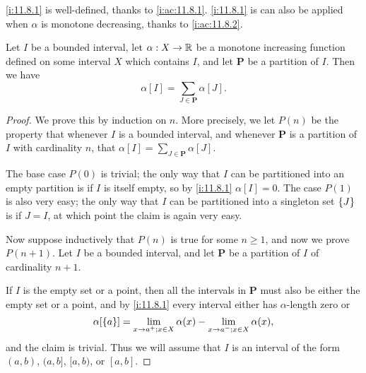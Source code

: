 \begin{note}
  \cref{i:11.8.1} is well-defined, thanks to \cref{i:ac:11.8.1}.
  \cref{i:11.8.1} is can also be applied when \(\alpha\) is monotone decreasing, thanks to \cref{i:ac:11.8.2}.
\end{note}

\setcounter{thm}{3}
\begin{lem}\label{i:11.8.4}
  Let \(I\) be a bounded interval, let \(\alpha : X \to \mathbb{R}\) be a monotone increasing function defined on some interval \(X\) which contains \(I\), and let \(\mathbf{P}\) be a partition of \(I\).
  Then we have
  \[
    \alpha[I] = \sum_{J \in \mathbf{P}} \alpha[J].
  \]
\end{lem}

\begin{proof}
  We prove this by induction on \(n\).
  More precisely, we let \(P(n)\) be the property that whenever \(I\) is a bounded interval, and whenever \(\mathbf{P}\) is a partition of \(I\) with cardinality \(n\), that \(\alpha[I] = \sum_{J \in \mathbf{P}} \alpha[J]\).

  The base case \(P(0)\) is trivial;
  the only way that \(I\) can be partitioned into an empty partition is if \(I\) is itself empty, so by \cref{i:11.8.1} \(\alpha[I] = 0\).
  The case \(P(1)\) is also very easy;
  the only way that \(I\) can be partitioned into a singleton set \(\left\lbrace J\right\rbrace\) is if \(J = I\), at which point the claim is again very easy.

  Now suppose inductively that \(P(n)\) is true for some \(n \geq 1\), and now we prove \(P(n + 1)\).
  Let \(I\) be a bounded interval, and let \(\mathbf{P}\) be a partition of \(I\) of cardinality \(n + 1\).

  If \(I\) is the empty set or a point, then all the intervals in \(\mathbf{P}\) must also be either the empty set or a point, and by \cref{i:11.8.1} every interval either has \(\alpha\)-length zero or
  \[
    \alpha[\left\lbrace a\right\rbrace] = \lim_{x \to a^+ ; x \in X} \alpha(x) - \lim_{x \to a^- ; x \in X} \alpha(x),
  \]
  and the claim is trivial.
  Thus we will assume that \(I\) is an interval of the form \((a, b)\), \((a, b]\), \([a, b)\), or \([a, b]\).


\end{proof}
